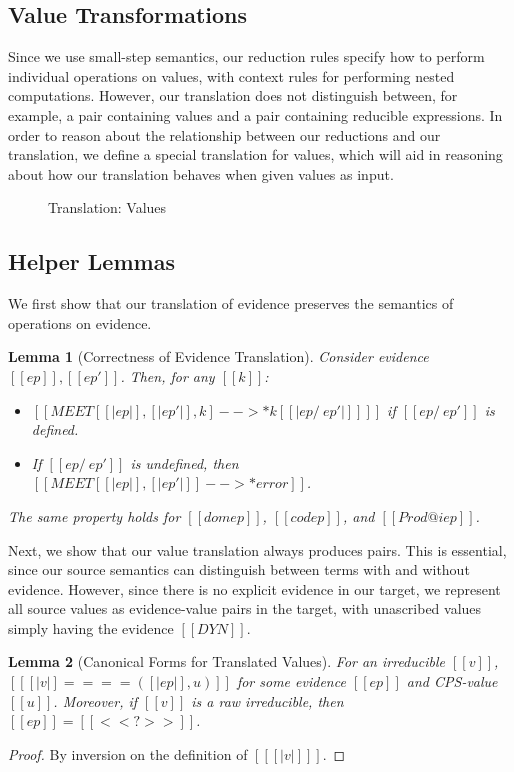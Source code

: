 \documentclass[11pt]{article}
\newtheorem{lemma}{Lemma}[section]
\begin{document}
\subsection{Value Transformations}

Since we use small-step semantics, our reduction rules specify how to perform individual operations
on values, with context rules for performing nested computations. However, our translation does not distinguish
between, for example, a pair containing values and a pair containing reducible expressions.
In order to reason about the relationship between our reductions and our translation,
we define a special translation for values, which will aid in reasoning about how our translation
behaves when given values as input.

\begin{figure}[H]
	\ottdefnValTransform
	\caption{Translation: Values}
	\label{fig:trans-values}
\end{figure}

\subsection{Helper Lemmas}

We first show that our translation of evidence preserves the semantics of operations on evidence.

\begin{lemma}[Correctness of Evidence Translation]
	\label{lem:ev-correct}
	Consider evidence $[[ep]],[[ep']]$. Then, for any $[[k]]$:
	\begin{itemize}
		\item $[[MEET[ [|ep|], [|ep'|], k ] -->* k[ [| ep /\ ep' |] ] ]]$ if $[[ep /\ ep']]$ is defined.
		\item If $[[ep /\ ep']]$ is undefined, then $[[MEET[ [|ep|], [|ep'|] ] -->* error ]]$.
	\end{itemize}
	The same property holds for $[[dom ep]]$, $[[cod ep]]$, and $[[Prod@i ep]]$. 
\end{lemma}

Next, we show that our value translation always produces pairs. This is essential, since our source semantics
can distinguish between terms with and without evidence. However, since there is no explicit evidence in our target,
we represent all source values as evidence-value pairs in the target, with unascribed values simply
having the evidence $[[DYN]]$.  

\begin{lemma}[Canonical Forms for Translated Values]
	\label{lem:canonical-trans}
	For an irreducible $[[v]]$, $[[ [|v|] ==== ( [|ep|], u) ]] $ for some evidence $[[ep]]$ and CPS-value $[[u]]$.
	Moreover, if $[[v]]$ is a raw irreducible, then $[[ep]]=[[<<?>>]]$.
\end{lemma}
\begin{proof}
	By inversion on the definition of $[[ [|v|] ]]$.
\end{proof}
\end{document}
